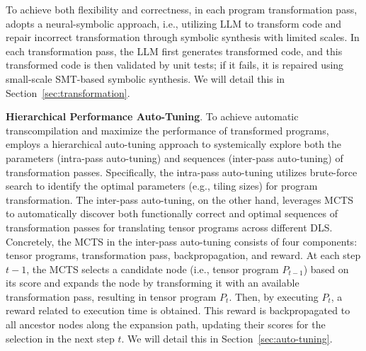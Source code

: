 To achieve both flexibility and correctness, in each program transformation pass, \name{} adopts a neural-symbolic approach, i.e., utilizing LLM to transform code and repair incorrect transformation through symbolic synthesis with limited scales.
In each transformation pass, the LLM first generates transformed code, and this transformed code is then validated by unit tests; if it fails, it is repaired using small-scale SMT-based symbolic synthesis. We will detail this in Section~\ref{sec:transformation}.




\textbf{Hierarchical Performance Auto-Tuning}. To achieve automatic transcompilation and maximize the performance of transformed programs, \name{} employs a hierarchical auto-tuning approach
to systemically explore both the parameters (intra-pass auto-tuning) and sequences (inter-pass auto-tuning)
of transformation passes.
Specifically, the intra-pass auto-tuning utilizes brute-force search to identify the optimal parameters (e.g., tiling sizes) for program transformation. 
The inter-pass auto-tuning, on the other hand, leverages MCTS to automatically discover both functionally correct and optimal sequences of transformation passes for translating tensor programs across different DLS.
Concretely, the MCTS in the inter-pass auto-tuning consists of four components: tensor programs, transformation pass, backpropagation, and reward. 
At each step \( t-1 \), the MCTS selects a candidate node (i.e., tensor program \( P_{t-1} \)) based on its score and expands the node by transforming it with an available transformation pass, resulting in tensor program \( P_{t} \).
Then, by executing \( P_{t} \), a reward related to execution time is obtained. 
This reward is backpropagated to all ancestor nodes along the expansion path, updating their scores for the selection in the next step \( t \).
We will detail this in Section~\ref{sec:auto-tuning}.

